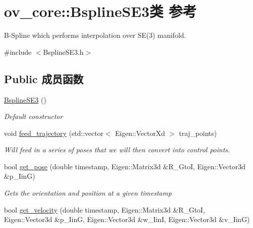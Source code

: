 \hypertarget{classov__core_1_1BsplineSE3}{}\section{ov\+\_\+core\+:\+:Bspline\+S\+E3类 参考}
\label{classov__core_1_1BsplineSE3}


B-\/\+Spline which performs interpolation over S\+E(3) manifold.  




{\ttfamily \#include $<$Bspline\+S\+E3.\+h$>$}

\subsection*{Public 成员函数}
\begin{DoxyCompactItemize}
\item 
\mbox{\label{classov__core_1_1BsplineSE3_a1c4d986ac85cab989d26638f6ede2245}} 
\hyperlink{classov__core_1_1BsplineSE3_a1c4d986ac85cab989d26638f6ede2245}{Bspline\+S\+E3} ()
\begin{DoxyCompactList}\small\item\em Default constructor \end{DoxyCompactList}\item 
void \hyperlink{classov__core_1_1BsplineSE3_a2031f15f618b1e4654f5933a987b1cd2}{feed\+\_\+trajectory} (std\+::vector$<$ Eigen\+::\+Vector\+Xd $>$ traj\+\_\+points)
\begin{DoxyCompactList}\small\item\em Will feed in a series of poses that we will then convert into control points. \end{DoxyCompactList}\item 
bool \hyperlink{classov__core_1_1BsplineSE3_a2b80d8e6bf5fe51a35b789ab3c68f6a3}{get\+\_\+pose} (double timestamp, Eigen\+::\+Matrix3d \&R\+\_\+\+GtoI, Eigen\+::\+Vector3d \&p\+\_\+\+IinG)
\begin{DoxyCompactList}\small\item\em Gets the orientation and position at a given timestamp \end{DoxyCompactList}\item 
bool \hyperlink{classov__core_1_1BsplineSE3_abf2eacd708d5adb25741fe7806a3c7a6}{get\+\_\+velocity} (double timestamp, Eigen\+::\+Matrix3d \&R\+\_\+\+GtoI, Eigen\+::\+Vector3d \&p\+\_\+\+IinG, Eigen\+::\+Vector3d \&w\+\_\+\+IinI, Eigen\+::\+Vector3d \&v\+\_\+\+IinG)

\end{DoxyCompactItemize}

